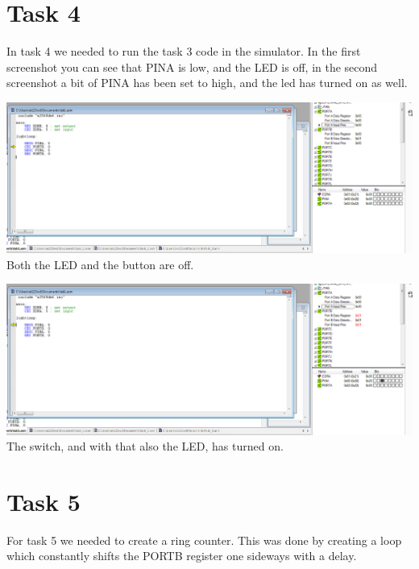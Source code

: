 \documentclass[a4paper,12pt]{article}
\begin{document}
\break

\section{Task 4}
In task 4 we needed to run the task 3 code in the simulator. In the first screenshot you can see that PINA is low, and the LED is off, in the second screenshot a bit of PINA has been set to high, and the led has turned on as well. 

\begin{center}
\includegraphics[width=\textwidth ]{img/task4_1.png}
Both the LED and the button are off.

\includegraphics[width=\textwidth ]{img/task4_2.png}
The switch, and with that also the LED, has turned on.
\end{center}

\section{Task 5}
For task 5 we needed to create a ring counter. This was done by creating a loop which constantly shifts the PORTB register one sideways with a delay.

\lstset{style=Asm}
\end{document}
